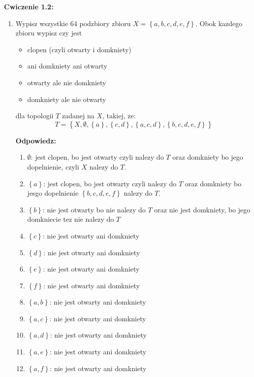\documentclass{article}
\begin{document}
\textbf{Cwiczenie 1.2:}
\begin{enumerate}%

    \item Wypisz wszystkie 64 podzbiory zbioru $X = \left\{a,b,c,d,e,f \right\}$. Obok kazdego zbioru wypisz czy jest 
        \begin{itemize}
            \item clopen (czyli otwarty i domkniety)
            \item ani domkniety ani otwarty
            \item otwarty ale nie domkniety
            \item domkniety ale nie otwarty
        \end{itemize}
        dla topologii $T$ zadanej na $X$, takiej, ze: $$T = \left\{ X, \emptyset, \left\{ a \right\}, \left\{ c,d \right\}, \left\{ a,c,d \right\}, \left\{ b,c,d,e,f \right\} \right\}$$

        \textbf{Odpowiedz:}
        \begin{enumerate}[label=\arabic*.] %

            \item $\emptyset$: jest clopen, bo jest otwarty czyli nalezy do $T$ oraz domkniety bo jego dopelnienie, czyli $X$ nalezy do $T$.
            \item $\left\{ a \right\}$: jest clopen, bo jest otwarty czyli nalezy do $T$ oraz domkniety bo jesgo dopelnienie $\left\{ b,c,d,e,f \right\}$ nalezy do $T$.
            \item $\left\{ b \right\}$: nie jest otwarty bo nie nalezy do $T$ oraz nie jest domkniety, bo jego domkniecie tez nie nalezy do $T$
            \item $\left\{ c \right\}$: nie jest otwarty ani domkniety
            \item $\left\{ d \right\}$: nie jest otwarty ani domkniety
            \item $\left\{ e \right\}$: nie jest otwarty ani domkniety
            \item $\left\{ f \right\}$: nie jest otwarty ani domkniety

            \item $\left\{ a,b \right\}$: nie jest otwarty ani domkniety
            \item $\left\{ a,c \right\}$: nie jest otwarty ani domkniety
            \item $\left\{ a,d \right\}$: nie jest otwarty ani domkniety
            \item $\left\{ a,e \right\}$: nie jest otwarty ani domkniety
            \item $\left\{ a,f \right\}$: nie jest otwarty ani domkniety


\end{enumerate}
\end{enumerate}
\end{document}
